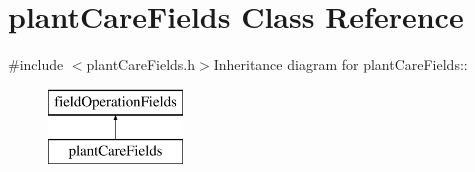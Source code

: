 \hypertarget{classplant_care_fields}{
\section{plantCareFields Class Reference}
\label{classplant_care_fields}
}


{\ttfamily \#include $<$plantCareFields.h$>$}Inheritance diagram for plantCareFields::\begin{figure}[H]
\begin{center}
\leavevmode
\includegraphics[height=2cm]{classplant_care_fields}
\end{center}
\end{figure}
